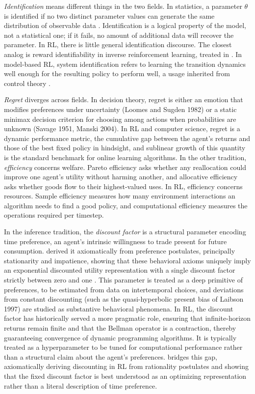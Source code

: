 \textit{Identification} means different things in the two fields. In statistics, a parameter $\theta$ is identified if no two distinct parameter values can generate the same distribution of observable data \citep{Lewbel2019}. Identification is a logical property of the model, not a statistical one; if it fails, no amount of additional data will recover the parameter. In RL, there is little general identification discourse. The closest analog is reward identifiability in inverse reinforcement learning, treated in \citet{RustRawat2026}. In model-based RL, system identification refers to learning the transition dynamics well enough for the resulting policy to perform well, a usage inherited from control theory \citep{RossBagnell2012}.

\textit{Regret} diverges across fields. In decision theory, regret is either an emotion that modifies preferences under uncertainty (Loomes and Sugden 1982) or a static minimax decision criterion for choosing among actions when probabilities are unknown (Savage 1951, Manski 2004). In RL and computer science, regret is a dynamic performance metric, the cumulative gap between the agent's returns and those of the best fixed policy in hindsight, and sublinear growth of this quantity is the standard benchmark for online learning algorithms. In the other tradition, \textit{efficiency} concerns welfare. Pareto efficiency asks whether any reallocation could improve one agent's utility without harming another, and allocative efficiency asks whether goods flow to their highest-valued uses. In RL, efficiency concerns resources. Sample efficiency measures how many environment interactions an algorithm needs to find a good policy, and computational efficiency measures the operations required per timestep.

In the inference tradition, the \textit{discount factor} is a structural parameter encoding time preference, an agent's intrinsic willingness to trade present for future consumption. \citet{Koopmans1960} derived it axiomatically from preference postulates, principally stationarity and impatience, showing that these behavioral axioms uniquely imply an exponential discounted utility representation with a single discount factor strictly between zero and one \citep{Bleichrodt2008}. This parameter is treated as a deep primitive of preferences, to be estimated from data on intertemporal choices, and deviations from constant discounting (such as the quasi-hyperbolic present bias of Laibson 1997) are studied as substantive behavioral phenomena. In RL, the discount factor has historically served a more pragmatic role, ensuring that infinite-horizon returns remain finite and that the Bellman operator is a contraction, thereby guaranteeing convergence of dynamic programming algorithms. It is typically treated as a hyperparameter to be tuned for computational performance rather than a structural claim about the agent's preferences. \citet{Pitis2019} bridges this gap, axiomatically deriving discounting in RL from rationality postulates and showing that the fixed discount factor is best understood as an optimizing representation rather than a literal description of time preference.

